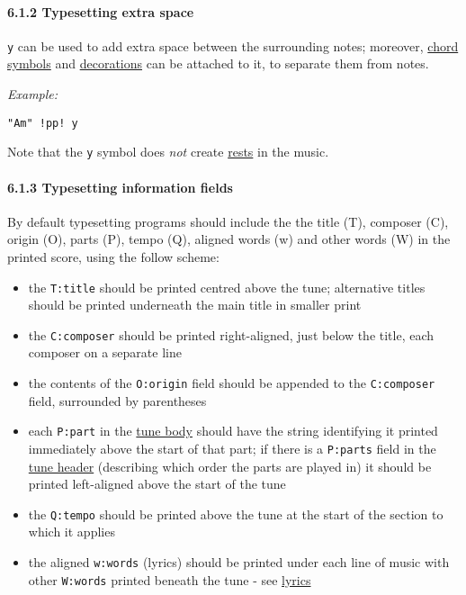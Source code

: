 \hypertarget{typesetting_extra_space}{\paragraph{6.1.2 Typesetting extra
space}\label{typesetting_extra_space}}

\texttt{y} can be used to add extra space between the surrounding notes;
moreover, \protect\hyperlink{chord_symbols}{chord symbols} and
\protect\hyperlink{decorations}{decorations} can be attached to it, to
separate them from notes.

\emph{Example:}

\begin{verbatim}
"Am" !pp! y
\end{verbatim}

Note that the \texttt{y} symbol does \emph{not} create
\protect\hyperlink{rests}{rests} in the music.

\hypertarget{typesetting_information_fields}{\paragraph{6.1.3
Typesetting information fields}\label{typesetting_information_fields}}

By default typesetting programs should include the the title (T),
composer (C), origin (O), parts (P), tempo (Q), aligned words (w) and
other words (W) in the printed score, using the follow scheme:

\begin{itemize}
\item
  the \texttt{T:title} should be printed centred above the tune;
  alternative titles should be printed underneath the main title in
  smaller print
\item
  the \texttt{C:composer} should be printed right-aligned, just below
  the title, each composer on a separate line
\item
  the contents of the \texttt{O:origin} field should be appended to the
  \texttt{C:composer} field, surrounded by parentheses
\item
  each \texttt{P:part} in the
  \protect\hyperlink{tune_body_definition}{tune body} should have the
  string identifying it printed immediately above the start of that
  part; if there is a \texttt{P:parts} field in the
  \protect\hyperlink{tune_header_definition}{tune header} (describing
  which order the parts are played in) it should be printed left-aligned
  above the start of the tune
\item
  the \texttt{Q:tempo} should be printed above the tune at the start of
  the section to which it applies
\item
  the aligned \texttt{w:words} (lyrics) should be printed under each
  line of music with other \texttt{W:words} printed beneath the tune -
  see \protect\hyperlink{lyrics}{lyrics}
\end{itemize}

